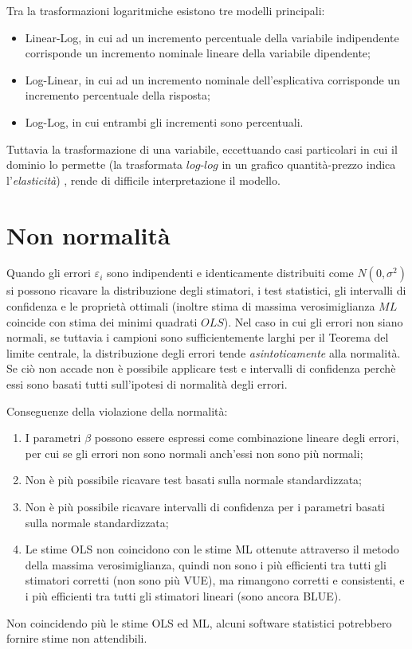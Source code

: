 \documentclass[a4page, 11pt]{article} %
\begin{document}
Tra la trasformazioni logaritmiche esistono tre modelli principali: 
\begin{itemize}[noitemsep]
\item Linear-Log, in cui ad un incremento percentuale della variabile indipendente corrisponde un incremento nominale lineare della variabile dipendente;
\item Log-Linear, in cui ad un incremento nominale dell’esplicativa corrisponde un incremento percentuale della risposta;
\item Log-Log, in cui entrambi gli incrementi sono percentuali.
\end{itemize}
Tuttavia la trasformazione di una variabile, eccettuando casi particolari in cui il dominio lo permette (la trasformata $log$-$log$ in un grafico quantità-prezzo indica l'\textit{elasticità}) , rende di difficile interpretazione il modello.

\section{Non normalità}

Quando gli errori $\varepsilon_i$ sono indipendenti e identicamente distribuiti come $N(0,\sigma^{2})$ si possono ricavare la distribuzione degli stimatori, i test statistici, gli intervalli di confidenza e le proprietà ottimali (inoltre stima di massima verosimiglianza $ML$ coincide con stima dei minimi quadrati $OLS$). 
Nel caso in cui gli errori non siano normali, se tuttavia i campioni sono sufficientemente larghi per il Teorema del limite centrale, la distribuzione degli errori tende \textit{asintoticamente} alla normalità. Se ciò non accade non è possibile applicare test e intervalli di confidenza perchè essi sono basati tutti sull’ipotesi di normalità degli errori.

Conseguenze della violazione della normalità:
\begin{enumerate}[noitemsep]
\item I parametri $\beta$ possono essere espressi come combinazione lineare degli errori, per cui se gli errori non sono normali anch’essi non sono più normali;
\item Non è più possibile ricavare test basati sulla normale standardizzata;
\item Non è più possibile ricavare intervalli di confidenza per i parametri basati sulla normale standardizzata;
\item Le stime OLS non coincidono con le stime ML ottenute attraverso il metodo della massima verosimiglianza, quindi non sono i più efficienti tra tutti gli stimatori corretti (non sono più VUE), ma rimangono corretti e consistenti, e i più efficienti tra tutti gli stimatori lineari (sono ancora BLUE).
\end{enumerate}
Non coincidendo più le stime OLS ed ML, alcuni software statistici potrebbero fornire stime non attendibili.
\end{document}
